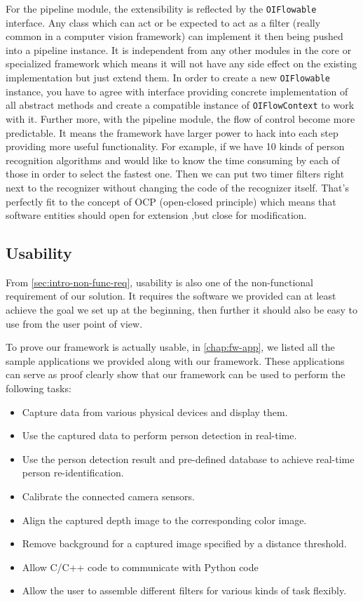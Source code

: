 For the pipeline module, the extensibility is reflected by the
\texttt{OIFlowable} interface. Any class which can act or be expected to act as
a filter (really common in a computer vision framework) can implement it then
being pushed into a pipeline instance.
It is independent from any other modules in the core or specialized framework
which means it will not have any side effect on the existing implementation but
just extend them.
In order to create a new \texttt{OIFlowable} instance, you have to agree with
interface providing concrete implementation of all abstract methods and create
a compatible instance of \texttt{OIFlowContext} to work with it.
Further more, with the pipeline module, the flow of control become more 
predictable. It means the framework have larger power to hack into each step
providing more useful functionality. For example, if we have 10 kinds of 
person recognition algorithms and would like to know the time consuming by each 
of those in order to select the fastest one. Then we can put two timer filters 
right next to the recognizer without changing the code of the recognizer itself.
That's perfectly fit to the concept of OCP (open-closed principle) which means 
that software entities should open for extension ,but close for modification. 

\subsection{Usability}
\label{sec:Eval-framework-usab}

From \autoref{sec:intro-non-func-req}, usability is also one of the
non-functional requirement of our solution. It requires the software we
provided can at least achieve the goal we set up at the beginning, then further
it should also be easy to use from the user point of view.

To prove our framework is actually usable, in \autoref{chap:fw-app}, we
listed all the sample applications we provided along with our framework.
These applications can serve as proof clearly show that our framework can
be used to perform the following tasks:

\begin{itemize}
    \item Capture data from various physical devices and display them.
    \item Use the captured data to perform person detection in real-time.
    \item Use the person detection result and pre-defined database to achieve
          real-time person re-identification.
    \item Calibrate the connected camera sensors.
    \item Align the captured depth image to the corresponding color image.
    \item Remove background for a captured image specified by a distance
          threshold.
    \item Allow C/C++ code to communicate with Python code
    \item Allow the user to assemble different filters for various kinds of
          task flexibly.
\end{itemize}

